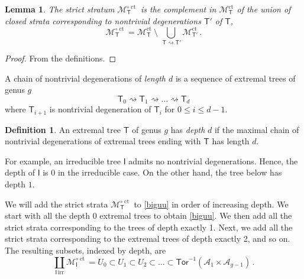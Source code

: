 \documentclass[11pt]{amsart}
\newtheorem{lem}[thm]{Lemma}
\theoremstyle{definition}
\newtheorem{definition}[thm]{Definition}
\newcommand{\M}{\mathcal{M}}
\newcommand{\A}{\mathcal{A}}
\DeclareMathOperator{\ct}{ct}
\newcommand{\Tor}{\mathsf{Tor}}
\begin{document}
{ \begin{lem} 
The strict stratum $\mathcal{M}^{\circ\ct}_{\mathsf{T}}$
is the complement in $\mathcal{M}^{\ct}_{\mathsf{T}}$ of the union of
closed strata
corresponding to nontrivial degenerations 
$\mathsf{T}'$
of $\mathsf{T}$,
$$\mathcal{M}^{\circ\ct}_{\mathsf{T}} =  \mathcal{M}^{\ct}_{\mathsf{T}}\  \setminus \
\bigcup_{\ \mathsf{T} \rightsquigarrow \mathsf{T}'} \mathcal{M}^{\ct}_{\mathsf{T}'}\, .
$$
\end{lem}

\begin{proof} From the definitions.
\end{proof}
 
 
 
 A chain of nontrivial
 degenerations of {\em length $d$} is a sequence of extremal trees
of genus $g$
$$\mathsf{T}_0 \rightsquigarrow \mathsf{T}_1\rightsquigarrow \ldots
\rightsquigarrow \mathsf{T}_d $$
where $\mathsf{T}_{i+1}$ is
nontrivial degeneration of $\mathsf{T}_i$ 
for $0\leq i \leq d-1$.

\begin{definition}
An extremal tree $\mathsf{T}$  of genus $g$ has {\em depth} $d$
    if the maximal chain of
    nontrivial degenerations of
    extremal trees ending with $\mathsf{T}$ has length $d$.
\end{definition}

 For example, an irreducible tree $\mathsf I$ admits no nontrivial degenerations. Hence, the depth of
 $\mathsf{I}$ is 0 in the irreducible case. On the other hand, the tree below has depth $1$. 
\begin{center}
\end{center}


We will add the strict strata 
 $\M_\mathsf{T}^{\circ \ct}$
to \eqref{biguu} in order of increasing depth. 
We start with all the depth 0 extremal trees to obtain \eqref{biguu}.
We then add all the  strict 
strata corresponding to the trees of depth exactly 1. Next,  
we add all the strict strata corresponding to the extremal trees of depth exactly 2, and so on.
The  resulting subsets, indexed by depth, are
$$\coprod_{\mathsf{I} \, \mathrm{irr}} \M_\mathsf{I}^{\circ \ct}=U_0 \subset U_1 \subset U_2 \subset \ldots \subset 
\Tor^{-1}(\A_1\times \A_{g-1})\, .
$$

}
\end{document}
